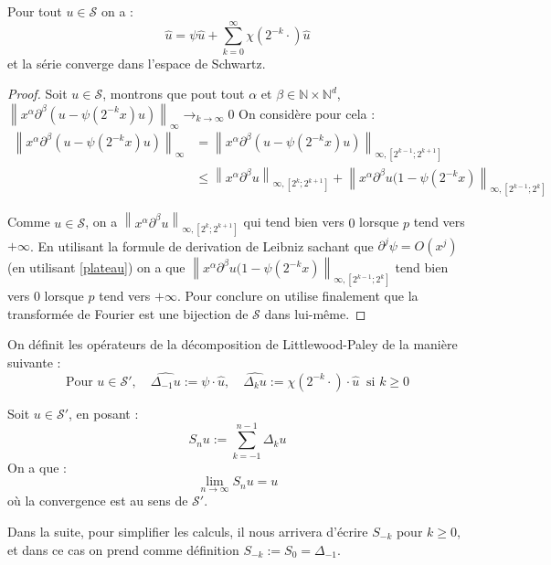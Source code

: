 \documentclass[11pt,a4paper]{article}
\begin{document}
\begin{lemma}\label{decomp}
Pour tout $u \in \mathcal{S}$ on a :
\[ \hat{u} = \psi \hat{u} + \sum_{k=0}^\infty \chi(2^{-k} \cdot) \hat{u} \]
et la série converge dans l'espace de Schwartz.
\end{lemma}
\begin{proof}
Soit $u \in \mathcal{S}$, montrons que pout tout $\alpha$ et $\beta \in \mathbb{N}\times \mathbb{N}^d $, $\left\lVert x^\alpha \partial^\beta(u-\psi(2^{-k}x)u) \right\rVert_\infty \to_{k\to \infty} 0$
On considère pour cela :
\begin{align*}
    \left\lVert x^\alpha \partial^\beta(u-\psi(2^{-k}x)u)\right\rVert_\infty &= \left\lVert x^\alpha \partial^\beta(u-\psi(2^{-k}x)u)\right\rVert_{\infty,[2^{k-1};2^{k+1}]} \\
    &\leq \left\lVert x^\alpha \partial^\beta u\right\rVert_{\infty,[2^{k};2^{k+1}]} + \left\lVert x^\alpha \partial^\beta u(1-\psi(2^{-k}x)\right\rVert_{\infty,[2^{k-1};2^{k}]}
\end{align*}

Comme $u \in \mathcal{S}$, on a $\left\lVert x^\alpha \partial^\beta u\right\rVert_{\infty,[2^{k};2^{k+1}]}$ qui tend bien vers $0$ lorsque $p$ tend vers $+\infty$. En utilisant la formule de derivation de Leibniz sachant que $\partial^j \psi = O(x^{j})$ (en utilisant \eqref{plateau}) on a que $\left\lVert x^\alpha \partial^\beta u(1-\psi(2^{-k}x)\right\rVert_{\infty,[2^{k-1};2^{k}]}$ tend bien vers $0$ lorsque $p$ tend vers $+\infty$. Pour conclure on utilise finalement que la transformée de Fourier est une bijection de $\mathcal{S}$ dans lui-même.
\end{proof}

\begin{defin}
On définit les opérateurs de la décomposition de Littlewood-Paley de la manière suivante :
\[
\text{Pour } u \in \mathcal{S}', \quad \widehat{\Delta_{-1} u} := \psi \cdot \hat{u}, \quad \widehat{\Delta_{k} u} := \chi(2^{-k} \cdot) \cdot \hat{u} \ \text{ si } k \geq 0
\]
\end{defin}

\begin{prop}
Soit $u \in \mathcal{S}'$, en posant :
\[ S_n u := \sum_{k=-1}^{n-1} \Delta_k u \]
On a que :
\[ \lim_{n \to \infty} S_n u = u \]
où la convergence est au sens de $\mathcal{S}'$.
\end{prop}
\begin{rmq}
Dans la suite, pour simplifier les calculs, il nous arrivera d'écrire $S_{-k}$ pour $k\geq 0$, et dans ce cas on prend comme définition $S_{-k} := S_{0} = \Delta_{-1}$.
\end{rmq}
\end{document}
